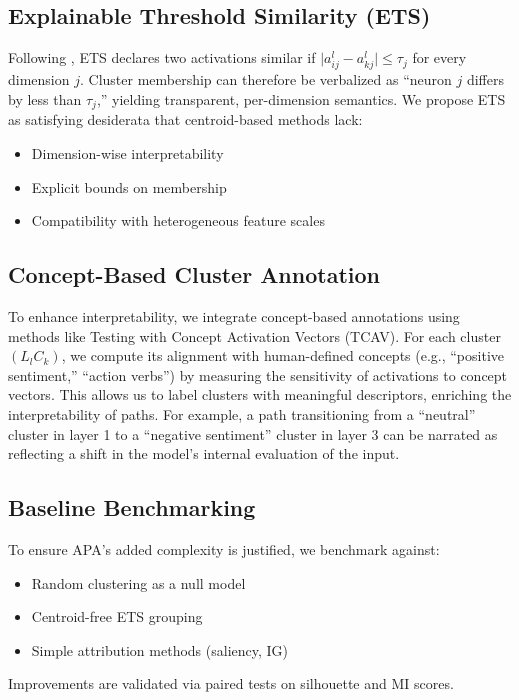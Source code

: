 \subsection{Explainable Threshold Similarity (ETS)}

Following \citet{kovalerchuk2024}, ETS declares two activations similar if $\bigl|a_{ij}^l - a_{kj}^l\bigr| \leq \tau_j$ for every dimension $j$. Cluster membership can therefore be verbalized as ``neuron $j$ differs by less than $\tau_j$,'' yielding transparent, per-dimension semantics. We propose ETS as satisfying desiderata that centroid-based methods lack:
\begin{itemize}
    \item Dimension-wise interpretability
    \item Explicit bounds on membership
    \item Compatibility with heterogeneous feature scales
\end{itemize}

\subsection{Concept-Based Cluster Annotation}

To enhance interpretability, we integrate concept-based annotations using methods like Testing with Concept Activation Vectors (TCAV). For each cluster $(L_lC_k)$, we compute its alignment with human-defined concepts (e.g., ``positive sentiment,'' ``action verbs'') by measuring the sensitivity of activations to concept vectors. This allows us to label clusters with meaningful descriptors, enriching the interpretability of paths. For example, a path transitioning from a ``neutral'' cluster in layer 1 to a ``negative sentiment'' cluster in layer 3 can be narrated as reflecting a shift in the model's internal evaluation of the input.

\subsection{Baseline Benchmarking}

To ensure APA's added complexity is justified, we benchmark against:
\begin{itemize}
    \item Random clustering as a null model
    \item Centroid-free ETS grouping
    \item Simple attribution methods (saliency, IG) 
\end{itemize}
Improvements are validated via paired tests on silhouette and MI scores.